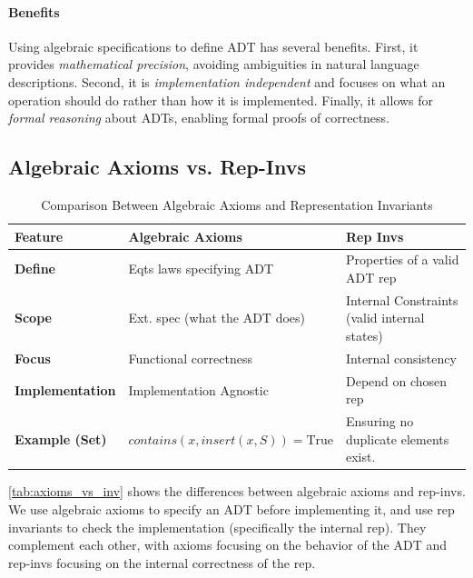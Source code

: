 \documentclass[oneside,11pt,dvipsnames]{book}
\begin{document}
\paragraph{Benefits} Using algebraic specifications to define ADT has several benefits.
First, it provides \emph{mathematical precision}, avoiding ambiguities in natural language descriptions. Second, it is \emph{implementation independent} and focuses on what an operation should do rather than how it is implemented. Finally, it allows for \emph{formal reasoning} about ADTs, enabling formal proofs of correctness.


\subsection{Algebraic Axioms vs. Rep-Invs}

\begin{table}[h]
    \footnotesize
    \centering
    \caption{Comparison Between Algebraic Axioms and Representation Invariants}
    \label{tab:axioms_vs_inv}
    \begin{tabular}{lll}
        \toprule
        \textbf{Feature} & \textbf{Algebraic Axioms} & \textbf{Rep Invs} \\
        \midrule
        \textbf{Define} & Eqts laws specifying ADT & Properties of a valid ADT rep \\
        \midrule
        \textbf{Scope} & Ext. spec (what the ADT does) &Internal Constraints (valid internal states)\\
        \midrule
        \textbf{Focus} & Functional correctness & Internal consistency\\
        \midrule
        \textbf{Implementation} & Implementation Agnostic & Depend on chosen rep\\
        \midrule
        \textbf{Example (Set)} & $contains(x, insert(x, S)) = \text{True}$ & Ensuring no duplicate elements exist. \\
        \bottomrule
    \end{tabular}
\end{table}

\autoref{tab:axioms_vs_inv} shows the differences between algebraic axioms and rep-invs.  
We use algebraic axioms to specify an ADT before implementing it, and use rep invariants to check the implementation (specifically the internal rep). They complement each other, with axioms focusing on the behavior of the ADT and rep-invs focusing on the internal correctness of the rep.
\end{document}
